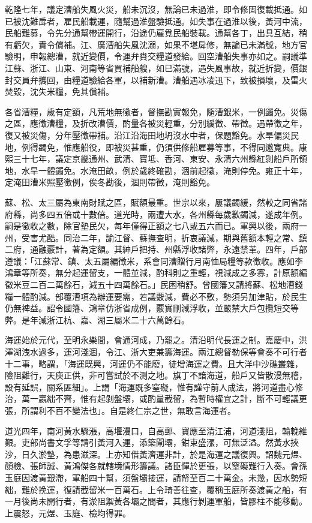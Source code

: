 \begin{pinyinscope}
乾隆七年，議定漕船失風火災，船未沉沒，無論已未過淮，即令修固復載抵通。如已被沈難戽者，雇民船載運，隨幫過淮盤驗抵通。如失事在過淮以後，黃河中流，民船難募，令先分通幫帶運開行，沿途仍雇覓民船裝載。通幫各丁，出具互結，稍有虧欠，責令償補。江、廣漕船失風沈溺，如果不堪戽修，無論已未滿號，地方官驗明，申報總漕，就近變價，令運弁賚交糧道發給。回空漕船失事亦如之。嗣議準江蘇、浙江、山東、河南等省買補船艘，如已滿號，遇失風事故，就近折變，價銀封交員弁攜回，由糧道驗給各軍，以補新漕。漕船遇冰凌迅下，致被損壞，及雷火焚毀，沈失米糧，免其償補。

各省漕糧，歲有定額，凡荒地無徵者，督撫勘實報免，隨漕銀米，一例蠲免。災傷之區，應徵漕糧，及折改漕價，酌量各被災輕重，分別緩徵、帶徵。遇帶徵之年，復又被災傷，分年壓徵帶補。沿江沿海田地坍沒水中者，保題豁免。水旱偏災民地，例得蠲免，惟應船役，即被災甚重，仍須供修船雇募等事，不得同邀寬典。康熙三十七年，議定京畿通州、武清、寶坻、香河、東安、永清六州縣紅剝船戶所領地，水旱一體蠲免。水淹田畝，例於歲終確勘，涸前起徵，淹則停免。雍正十年，定淹田漕米照壓徵例，俟冬勘後，涸則帶徵，淹則豁免。

蘇、松、太三屬為東南財賦之區，賦額最重。世宗以來，屢議蠲緩，然較之同省諸府縣，尚多四五倍或十數倍。道光時，兩遭大水，各州縣每歲歉蠲減，遂成年例。嗣是徵收之數，除官墊民欠，每年僅得正額之七八或五六而已。軍興以後，兩府一州，受害尤酷。同治二年，諭江督、蘇撫查明，折衷議減，期與舊額本輕之常、鎮二府，通融覈計，著為定額。其紳戶把持、州縣浮收諸弊，永遠禁革。四年，戶部遵議：「江蘇常、鎮、太五屬編徵米，系會同漕贈行月南恤局糧等款徵收。應如李鴻章等所奏，無分起運留支，一體並減，酌科則之重輕，視減成之多寡，計原額編徵米豆二百二萬餘石，減五十四萬餘石。」民困稍舒。曾國籓又請將蘇、松地漕錢糧一體酌減。部覆漕項為辦運要需，若議覈減，費必不敷，勢須另加津貼，於民生仍無裨益。詔令國籓、鴻章仿浙省成例，覈實刪減浮收，並嚴禁大戶包攬短交等弊。是年減浙江杭、嘉、湖三屬米二十六萬餘石。

海運始於元代，至明永樂間，會通河成，乃罷之。清沿明代長運之制。嘉慶中，洪澤湖洩水過多，運河淺涸，令江、浙大吏兼籌海運。兩江總督勒保等會奏不可行者十二事，略謂，「海運既興，河運仍不能廢，徒增海運之費。且大洋中沙礁叢雜，險阻難行，天庾正供，非可嘗試於不測之地。旗丁不諳海道，船戶又皆散漫無稽，設有延誤，關系匪細」。上謂「海運既多窒礙，惟有謹守前人成法，將河道盡心修治，萬一嬴絀不齊，惟有起剝盤壩，或酌量截留，為暫時權宜之計，斷不可輕議更張，所謂利不百不變法也」。自是終仁宗之世，無敢言海運者。

道光四年，南河黃水驟漲，高堰漫口，自高郵、寶應至清江浦，河道淺阻，輸輓維艱。吏部尚書文孚等請引黃河入運，添築閘壩，鉗束盛漲，可無泛溢。然黃水挾沙，日久淤墊，為患滋深。上亦知借黃濟運非計，於是海運之議復興。詔魏元煜、顏檢、張師誠、黃鴻傑各就轄境情形籌議。諸臣憚於更張，以窒礙難行入奏。會孫玉庭因渡黃艱滯，軍船四十幫，須盤壩接運，請帑至百二十萬金。未幾，因水勢短絀，難於挽運，復請截留米一百萬石。上令琦善往查，覆稱玉庭所奏渡黃之船，有一月後尚未開行者，有淤阻禦黃各壩之間者，其應行剝運軍船，皆膠柱不能移動。上震怒，元煜、玉庭、檢均得罪。


\end{pinyinscope}
